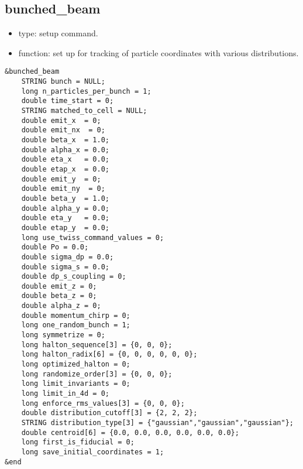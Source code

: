 \documentclass[11pt]{article}
\begin{document}
\subsection{bunched\_beam \label{subsec:bunchedbeam}}

\begin{itemize}
\item type: setup command.
\item function: set up for tracking of particle coordinates with various distributions.
\end{itemize}

\begin{verbatim}
&bunched_beam
    STRING bunch = NULL;
    long n_particles_per_bunch = 1;
    double time_start = 0;
    STRING matched_to_cell = NULL;
    double emit_x  = 0;
    double emit_nx  = 0;
    double beta_x  = 1.0;
    double alpha_x = 0.0;
    double eta_x   = 0.0;
    double etap_x  = 0.0;
    double emit_y  = 0;
    double emit_ny  = 0;
    double beta_y  = 1.0;
    double alpha_y = 0.0;
    double eta_y   = 0.0;
    double etap_y  = 0.0;
    long use_twiss_command_values = 0;
    double Po = 0.0;
    double sigma_dp = 0.0;
    double sigma_s = 0.0;
    double dp_s_coupling = 0;
    double emit_z = 0;
    double beta_z = 0;
    double alpha_z = 0;
    double momentum_chirp = 0;
    long one_random_bunch = 1;
    long symmetrize = 0;
    long halton_sequence[3] = {0, 0, 0};
    long halton_radix[6] = {0, 0, 0, 0, 0, 0};
    long optimized_halton = 0;
    long randomize_order[3] = {0, 0, 0};
    long limit_invariants = 0;
    long limit_in_4d = 0;
    long enforce_rms_values[3] = {0, 0, 0};
    double distribution_cutoff[3] = {2, 2, 2};
    STRING distribution_type[3] = {"gaussian","gaussian","gaussian"};
    double centroid[6] = {0.0, 0.0, 0.0, 0.0, 0.0, 0.0};
    long first_is_fiducial = 0;
    long save_initial_coordinates = 1;
&end
\end{verbatim}
\end{document}
